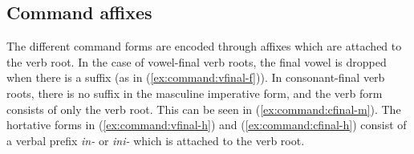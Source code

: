 \documentclass[12pt]{article}
\newcommand{\orth}[1]{\textit{\StrSubstitute{#1}{I}{\'{i}}[\x]\StrSubstitute{\x}{E}{\'{e}}[\x]\StrSubstitute{\x}{N}{\~{n}}[\x]\x}}
\begin{document}
%

\subsection{Command affixes}
The different command forms are encoded through affixes which are attached to the verb root. In the case of vowel-final verb roots, the final vowel is dropped when there is a suffix (as in (\ref{ex:command:vfinal-f})). In consonant-final verb roots, there is no suffix in the masculine imperative form, and the verb form consists of only the verb root. This can be seen in (\ref{ex:command:cfinal-m}). The hortative forms in (\ref{ex:command:vfinal-h}) and (\ref{ex:command:cfinal-h}) consist of a verbal prefix \textit{in-} or \textit{ini-} which is attached to the verb root.
\end{document}
